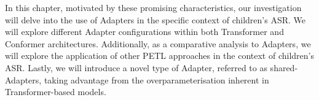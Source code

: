  In this chapter, motivated by these promising characteristics, our investigation will delve into the use of Adapters in the specific context of children's ASR. We will explore different Adapter configurations within both Transformer and Conformer architectures. Additionally, as a comparative analysis to Adapters, we will explore the application of other PETL approaches in the context of children's ASR. Lastly, we will introduce a novel type of Adapter, referred to as shared-Adapters, taking advantage from the overparameterisation inherent in Transformer-based models.






